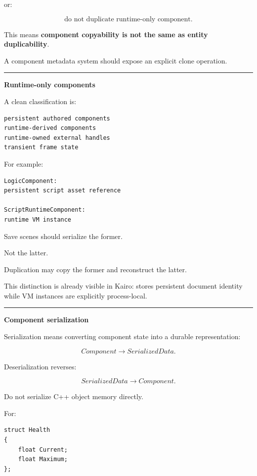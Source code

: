 or:

\[
\text{do not duplicate runtime-only component}.
\]

This means \textbf{component copyability is not the same as entity duplicability}.

A component metadata system should expose an explicit clone operation.

\begin{center}\rule{0.5\linewidth}{0.5pt}\end{center}

\textbf{Runtime-only components}

A clean classification is:

\begin{verbatim}
persistent authored components
runtime-derived components
runtime-owned external handles
transient frame state
\end{verbatim}

For example:

\begin{verbatim}
LogicComponent:
persistent script asset reference

ScriptRuntimeComponent:
runtime VM instance
\end{verbatim}

Save scenes should serialize the former.

Not the latter.

Duplication may copy the former and reconstruct the latter.

This distinction is already visible in Kairo:  stores persistent document identity while VM instances are explicitly process-local.

\begin{center}\rule{0.5\linewidth}{0.5pt}\end{center}

\textbf{Component serialization}

Serialization means converting component state into a durable representation:

\[
Component
\rightarrow
SerializedData.
\]

Deserialization reverses:

\[
SerializedData
\rightarrow
Component.
\]

Do not serialize C++ object memory directly.

For:

\begin{verbatim}
struct Health
{
    float Current;
    float Maximum;
};
\end{verbatim}

